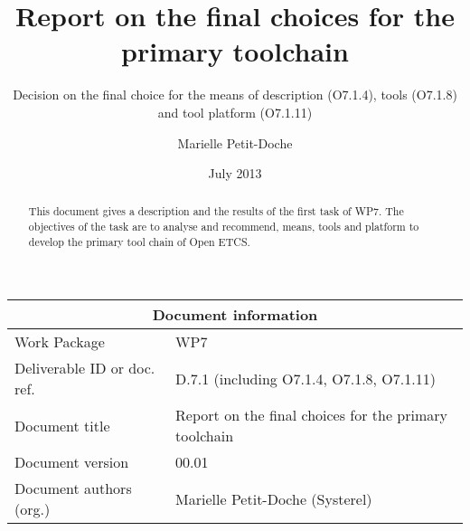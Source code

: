 \documentclass{template/openetcs_report}
\begin{document}
\frontmatter
{}




\title{Report on the final choices for the primary toolchain }

\subtitle{ Decision on the final choice for the means of description (O7.1.4), tools (O7.1.8) and tool platform (O7.1.11)}

\date{July 2013}


\author{Marielle Petit-Doche}



 


\begin{abstract}
This document gives  a description and the results of the first task of WP7. The objectives of the task are to analyse and recommend, means, tools and platform to develop the primary tool chain of Open ETCS.

\end{abstract}

\maketitle
\tableofcontents
\listoffiguresandtables
\newpage


\begin{tabular}{|p{4.4cm}|p{8.7cm}|}
\hline
\multicolumn{2}{|c|}{Document information} \\
\hline
Work Package &  WP7  \\
Deliverable ID or doc. ref. & D.7.1 (including O7.1.4, O7.1.8, O7.1.11) \\
\hline
Document title & Report on the final choices for the primary toolchain \\
Document version & 00.01 \\
Document authors (org.)  & Marielle Petit-Doche (Systerel)  \\
\hline
\end{tabular}
\end{document}
